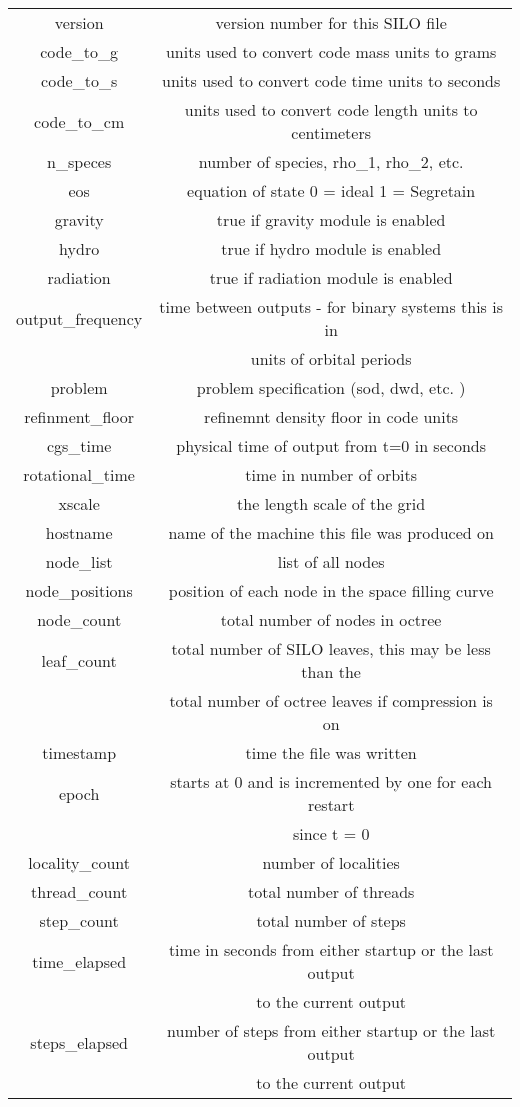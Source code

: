 \documentclass{article}
\begin{document}
\begin{tabular}{|c|c|}
\hline
version           & version number for this SILO file \\
code\_to\_g       & units used to convert code mass units to grams \\
code\_to\_s       & units used to convert code time units to seconds\\
code\_to\_cm      & units used to convert code length units to centimeters \\
n\_speces         & number of species, rho\_1, rho\_2, etc. \\
eos               & equation of state 0 = ideal 1 = Segretain \\
gravity           & true if gravity module is enabled \\
hydro             & true if hydro module is enabled \\
radiation         & true if radiation module is enabled \\
output\_frequency & time between outputs - for binary systems this is in \\
                  & units of orbital periods \\
problem           & problem specification (sod, dwd, etc. ) \\
refinment\_floor  & refinemnt density floor in code units \\
cgs\_time         & physical time of output from t=0 in seconds \\
rotational\_time  & time in number of orbits \\
xscale            & the length scale of the grid \\
hostname          & name of the machine this file was produced on \\
node\_list        & list of all nodes \\
node\_positions   & position of each node in the space filling curve \\
node\_count       & total number of nodes in octree \\
leaf\_count       & total number of SILO leaves, this may be less than the \\
                  & total number of octree leaves if compression is on \\
timestamp         & time the file was written \\
epoch             & starts at 0 and is incremented by one for each restart \\ 
                  & since t = 0 \\
locality\_count   & number of localities \\
thread\_count     & total number of threads \\
step\_count       & total number of steps \\
time\_elapsed     & time in seconds from either startup or the last output \\
                  & to the current output \\
steps\_elapsed    & number of steps from either startup or the last output \\
                  & to the current output  \\
\hline
\end{tabular}
\end{document}
